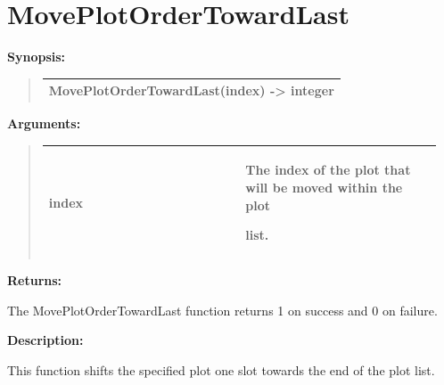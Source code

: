 \documentclass[letterpaper,10pt,english]{sphinxmanual}
\begin{document}
\section{MovePlotOrderTowardLast}
\label{functions:moveplotordertowardlast}
\begin{DUlineblock}{0em}
\item[] \textbf{Synopsis:}
\end{DUlineblock}
\begin{quote}

\begin{tabulary}{\linewidth}{|L|}
\hline

MovePlotOrderTowardLast(index) -\textgreater{} integer
\\
\hline\end{tabulary}

\end{quote}

\begin{DUlineblock}{0em}
\item[] 
\item[] \textbf{Arguments:}
\end{DUlineblock}
\begin{quote}

\begin{tabular}{|p{0.475\linewidth}|p{0.475\linewidth}|}
\hline

index
 & 
\begin{DUlineblock}{0em}
\item[] The index of the plot that will be moved within the plot
\item[] list.
\end{DUlineblock}
\\
\hline\end{tabular}

\end{quote}

\begin{DUlineblock}{0em}
\item[] 
\item[] \textbf{Returns:}
\item[] The MovePlotOrderTowardLast function returns 1 on success and 0 on failure.
\item[] 
\item[] \textbf{Description:}
\item[] This function shifts the specified plot one slot towards the end of the plot list.
\end{DUlineblock}

\begin{DUlineblock}{0em}
\item[] 
\end{DUlineblock}
\end{document}
